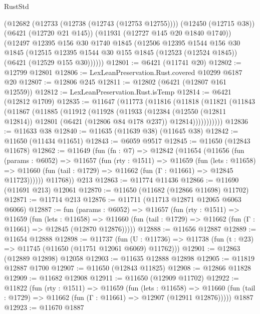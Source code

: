 \begin{lexlean}{RustStd}
\begin{coremodule}
    (@12682
      (@12733 (@12738 (@12743 (@12753 @12755))))
      (@12450 (@12715 @38))
      (@6421 (@12720 @21 @145))
      (@11931 (@12727 @145 @20 @1840 @1740))
      (@12497
        @12395
        @156
        @30
        @1740
        @1845
        (@12506
          @12395
          @1544
          @156
          @30
          @1845
          (@12515 @12395 @1544 @30 @155 @1845 (@12523 (@12524 @1845)) (@6421 (@12529 @155 @30))))))
@12801 := @6421 (@11741 @20)
@12802 := @12799 @12801
@12806 := LexLeanPreservation.Rust.covered @10299 @6187 @20
@12807 := @12806 @245
@12811 := @12802 (@6421 (@12807 @161 @12559))
@12812 := LexLeanPreservation.Rust.isTemp
@12814 := @6421 (@12812 @1709)
@12835 := @11647
    (@11773
      (@11816
        (@11818
          (@11821
            (@11843
              (@11867
                (@11885
                  (@11912
                    (@11928
                      (@11933
                        (@12384
                          (@12550 (@12811 @12814))
                          @12801
                          (@6421 (@12806 @84 @178 @237))
                          @12814)))))))))))
@12836 := @11633 @38
@12840 := @11635 (@11639 @38) (@11645 @38)
@12842 := @11650 (@11434 @11651)
@12843 := @6059 @9517
@12845 := @11650 (@12843 @11678)
@12862 := @11649
    (fun (fn : @7) =>
    @12842
      (@11654
        (@11656
          (fun (params : @6052) =>
          @11657
            (fun (rty : @1511) =>
            @11659
              (fun (lets : @11658) =>
              @11660 (fun (tail : @1729) => @11662 (fun (Γ : @11661) => @12845 @11723))))))
        @11768))
    @213
@12863 := @11774 @11436
@12866 := @11690 (@11691 @213) @12061
@12870 := @11650 (@11682 (@12866 @11698) @11702)
@12871 := @11714 @213
@12876 := @11711 (@11713 @12871 @12065 @6063 @6066)
@12887 := fun (params : @6052) =>
  @11657
    (fun (rty : @1511) =>
    @11659
      (fun (lets : @11658) =>
      @11660 (fun (tail : @1729) => @11662 (fun (Γ : @11661) => @12845 (@12870 @12876)))))
@12888 := @11656 @12887
@12889 := @11654 @12888
@12898 := @11737
    (fun (U : @11736) => @11738 (fun (t : @23) => @11745 (@11650 (@11751 @12061 @6069) @11762)))
@12901 := @12863 (@12889 @12898) @12058
@12903 := @11635 @12888 @12898
@12905 := @11819 @12887 @1700
@12907 := @11650 (@12843 @11825)
@12908 := @12866 @11828
@12909 := @11682 @12908
@12911 := @11650 (@12909 @11702)
@12922 := @11822
    (fun (rty : @1511) =>
    @11659
      (fun (lets : @11658) =>
      @11660 (fun (tail : @1729) => @11662 (fun (Γ : @11661) => @12907 (@12911 @12876)))))
    @1887
@12923 := @11670 @1887

\end{coremodule}
\end{lexlean}
